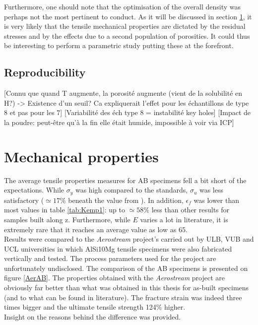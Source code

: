 Furthermore, one should note that the optimisation of the overall density was perhaps not the most pertinent to conduct. As it will be discussed in section \ref{DMPP}, it is very likely that the tensile mechanical properties are dictated by the residual stresses and by the effects due to a second population of porosities. It could thus be interesting to perform a parametric study putting these at the forefront.\\ 

\subsection{Reproducibility}

[Connu que quand T augmente, la porosité augmente (vient de la solubilité en H?) -> Existence d'un seuil? Ca expliquerait l'effet pour les échantillons de type 8 et pas pour les 7]
[Variabilité des éch type 8 = instabilité key holes]
[Impact de la poudre: peut-être qu'à la fin elle était humide, impossible à voir via ICP]

\section{Mechanical properties}
\label{DMPP}
The average tensile properties measures for AB specimens fell a bit short of the expectations. While $\sigma_y$ was high compared to the standards, $\sigma_u$ was less satisfactory ($\simeq 17\%$ beneath the value from \parencite{EOS}). In addition, $\epsilon_f$ was lower than most values in table \ref{tab:Kemp1}: up to $\simeq 58\%$ less than other results for samples built along z.  Furthermore, while $E$ varies a lot in literature, it is extremely rare that it reaches an average value as low as 65. \\

Results were compared to the \textit{Aerostream} project's carried out by ULB, VUB and UCL universities in which AlSi10Mg tensile specimens were also fabricated vertically and tested. The process parameters used for the project are unfortunately undisclosed. The comparison of the AB specimens is presented on figure \ref{AerAB}. The properties obtained with the \textit{Aerostream} project are obviously far better than what was obtained in this thesis for as-built specimens (and to what can be found in literature). The fracture strain was indeed three times bigger and the ultimate tensile strength 124\% higher. \\

Insight on the reasons behind the difference was provided.


